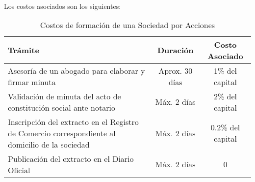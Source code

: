 Los costos asociados son los siguientes:
\begin{table}[htbc!]
\centering
\begin{tabular}{|p{8cm}|c|c|}
\hline
\textbf{Trámite}                                                                                & \textbf{Duración} & \textbf{Costo Asociado} \\
\hline
Asesoría de un abogado para elaborar y firmar minuta                                            & Aprox. 30 días    & 1\% del capital         \\
\hline
Validación de minuta del acto de constitución social ante notario                               & Máx. 2 días       & 2\% del capital         \\
\hline
Inscripción del extracto en el Registro de Comercio correspondiente al domicilio de la sociedad & Máx. 2 días       & 0.2\% del capital       \\
\hline
Publicación del extracto  en el Diario Oficial                                                  & Máx. 2 días       & 0                       \\
\hline
\end{tabular}
\caption{Costos de formación de una Sociedad por Acciones}
\end{table}


